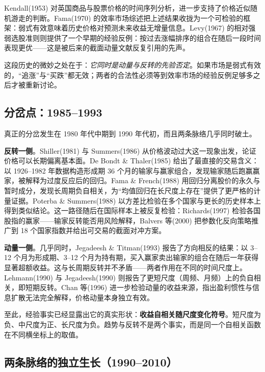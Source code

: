 Kendall(1953) 对英国商品与股票价格的时间序列分析，进一步支持了价格近似随机游走的判断\cite{kendall1953}。Fama(1970) 的效率市场综述把上述结果收拢为一个可检验的框架：弱式有效意味着历史价格对预测未来收益无增量信息\cite{fama1970}。Levy(1967) 的相对强弱选股准则则提供了一个早期的经验反例：按过去涨幅排序的组合在随后一段时间表现更优\cite{levy1967}——这是被后来的截面动量文献反复引用的先声。

这段历史的微妙之处在于：\emph{它同时是动量与反转的先验否定}。如果市场是弱式有效的，“追涨”与“买跌”都无效；两者的合法性必须等到效率市场的经验反例足够多之后才被重新讨论。

\subsection{分岔点：1985--1993}

真正的分岔发生在 1980 年代中期到 1990 年代初，而且两条脉络几乎同时破土。

\textbf{反转一侧}。Shiller(1981) 与 Summers(1986) 从价格波动过大这一现象出发，论证价格可以长期偏离基本面\cite{shiller1981,summers1986}。De Bondt \& Thaler(1985) 给出了最直接的交易含义：以 1926--1982 年数据构造形成期 36 个月的输家与赢家组合，发现输家随后跑赢赢家，被解释为过度反应后的回归\cite{debondt1985}。Fama \& French(1988) 用回归分离股价的永久与暂时成分，发现长周期负自相关，为“均值回归在长尺度上存在”提供了更严格的计量证据\cite{famafrench1988}。Poterba \& Summers(1988) 以方差比检验在多个国家与更长的历史样本上得到类似结论\cite{poterbsummers1988}。这一路径随后在国际样本上被反复检验：Richards(1997) 检验各国股指的赢家——输家反转能否用风险解释\cite{richards1997}，Balvers 等(2000) 把参数化反向策略推广到 18 个国家指数并给出可交易的截面对冲方案\cite{balvers2000}。

\textbf{动量一侧}。几乎同时，Jegadeesh \& Titman(1993) 报告了方向相反的结果：以 3--12 个月为形成期、3--12 个月为持有期，买入赢家卖出输家的组合在随后一年获得显著超额收益\cite{jegadeesh1993}。这与长周期反转并不矛盾——两者作用在不同的时间尺度上。Lehmann(1990) 与 Jegadeesh(1990) 则报告了更短尺度（周频、月频）上的负自相关，即短期反转\cite{lehmann1990,jegadeesh1990}。Chan 等(1996) 进一步检验动量的收益来源，指出盈利惯性与信息扩散无法完全解释，价格动量本身独立有效\cite{chan1996}。

至此，经验事实已经显露出它的真实形状：\textbf{收益自相关随尺度变化符号}。短尺度为负、中尺度为正、长尺度为负。趋势与反转不是两个事实，而是同一个自相关函数在不同横坐标上的取值。

\subsection{两条脉络的独立生长（1990--2010）}

